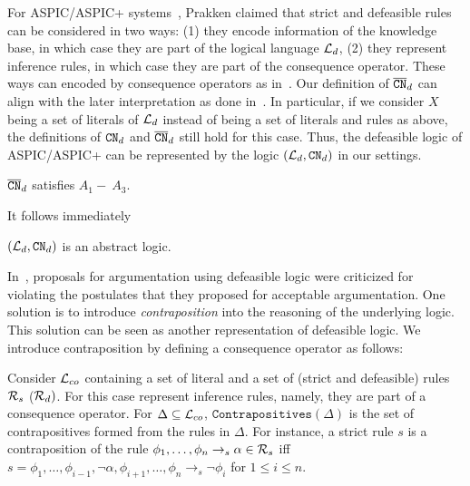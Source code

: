 \begin{remark}
\label{re:aspic}
For ASPIC/ASPIC+ systems~\cite{Prakken2002,ModgilP14}, Prakken claimed that strict and defeasible rules can be considered in two ways: (1) they encode information of the knowledge base, in which case they are part of the logical language $\mathcal{L}_d$, (2) they represent inference rules, in which case they are part of the consequence operator.
These ways can encoded by consequence operators as in~\cite{Amgoud12}. Our definition of $\overline{\texttt{\textup{CN}}}_{d}$ can align with the later interpretation as done in~\cite{Amgoud12}.
In particular, if we consider $X$ being a set of literals of $\mathcal{L}_d$ instead of being a set of literals and rules as above, the definitions of $\texttt{\textup{CN}}_d$ and $\overline{\texttt{\textup{CN}}}_d$ still hold for this case. 
Thus, the defeasible logic of ASPIC/ASPIC+ can be represented by the logic $(\mathcal{L}_d, \texttt{\textup{CN}}_d)$ in our settings.
\end{remark}

\begin{proposition} 
    $\overline{\texttt{\textup{CN}}}_d$ satisfies $A_1 -\ A_3$.
\end{proposition}

It follows immediately

\begin{lemma}
    $(\mathcal{L}_d, \texttt{\textup{CN}}_d)$ is an abstract logic.
\end{lemma}


In~\cite{CaminadaA07}, proposals for argumentation using defeasible logic were criticized for violating the postulates that they proposed for acceptable argumentation. One solution is to introduce \emph{contraposition} into the reasoning of the underlying logic. 
This solution can be seen as another representation of defeasible logic.
We introduce contraposition by defining a consequence operator as follows: 

Consider $\mathcal{L}_{co}$ containing a set of literal and a set of (strict and defeasible) rules $\mathcal{R}_{s}$ ($\mathcal{R}_{d})$. For this case represent inference rules, namely, they are part of a consequence operator.  For $\Delta \subseteq \mathcal{L}_{co}$,  $\texttt{Contrapositives}(\Delta)$ is the set of contrapositives formed from the rules in $\Delta$. For instance, a strict rule $s$ is a contraposition of the rule $\phi_1, \ldots, \phi_n \rightarrow_{s} \alpha \in \mathcal{R}_s$ iff $s = \phi_1, \ldots, \phi_{i-1}, \neg \alpha, \phi_{i+1}, \ldots, \phi_n \rightarrow_s \neg \phi_i$ for $ 1 \leq i \leq n$.

